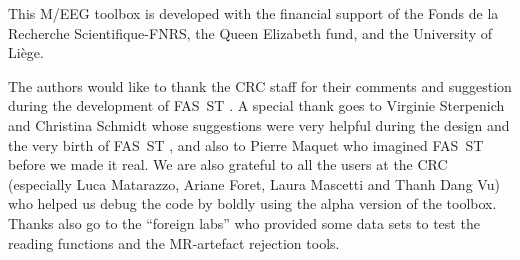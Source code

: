\documentclass[a4paper,titlepage]{article}
\def\dblS{\hbox{S\hskip -4.5pt S}}
\newcommand{\fasst}{FA\dblS T } 	%
\begin{document}
This M/EEG toolbox is developed with the financial support of the Fonds de la Recherche Scientifique-FNRS, the Queen Elizabeth fund, and the University of Li\`ege.

The authors would like to thank the CRC staff for their comments and suggestion during the development of \fasst\hspace{-4pt}. A special thank goes to Virginie Sterpenich and Christina Schmidt whose suggestions were very helpful during the design and the very birth of \fasst\hspace{-4pt}, and also to Pierre Maquet who imagined \fasst before we made it real. We are also grateful to all the users at the CRC (especially Luca Matarazzo, Ariane Foret, Laura Mascetti and Thanh Dang Vu) who helped us debug the code by boldly using the alpha version of the toolbox. Thanks also go to the ``foreign labs'' who provided some data sets to test the reading functions and the MR-artefact rejection tools.



\end{document}
